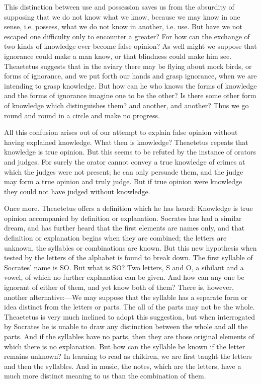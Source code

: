 \documentclass[11pt,letter]{article}
\begin{document}
\par  This distinction between use and possession saves us from the absurdity of supposing that we do not know what we know, because we may know in one sense, i.e. possess, what we do not know in another, i.e. use. But have we not escaped one difficulty only to encounter a greater? For how can the exchange of two kinds of knowledge ever become false opinion? As well might we suppose that ignorance could make a man know, or that blindness could make him see. Theaetetus suggests that in the aviary there may be flying about mock birds, or forms of ignorance, and we put forth our hands and grasp ignorance, when we are intending to grasp knowledge. But how can he who knows the forms of knowledge and the forms of ignorance imagine one to be the other? Is there some other form of knowledge which distinguishes them? and another, and another? Thus we go round and round in a circle and make no progress.

\par  All this confusion arises out of our attempt to explain false opinion without having explained knowledge. What then is knowledge? Theaetetus repeats that knowledge is true opinion. But this seems to be refuted by the instance of orators and judges. For surely the orator cannot convey a true knowledge of crimes at which the judges were not present; he can only persuade them, and the judge may form a true opinion and truly judge. But if true opinion were knowledge they could not have judged without knowledge.

\par  Once more. Theaetetus offers a definition which he has heard: Knowledge is true opinion accompanied by definition or explanation. Socrates has had a similar dream, and has further heard that the first elements are names only, and that definition or explanation begins when they are combined; the letters are unknown, the syllables or combinations are known. But this new hypothesis when tested by the letters of the alphabet is found to break down. The first syllable of Socrates' name is SO. But what is SO? Two letters, S and O, a sibilant and a vowel, of which no further explanation can be given. And how can any one be ignorant of either of them, and yet know both of them? There is, however, another alternative:—We may suppose that the syllable has a separate form or idea distinct from the letters or parts. The all of the parts may not be the whole. Theaetetus is very much inclined to adopt this suggestion, but when interrogated by Socrates he is unable to draw any distinction between the whole and all the parts. And if the syllables have no parts, then they are those original elements of which there is no explanation. But how can the syllable be known if the letter remains unknown? In learning to read as children, we are first taught the letters and then the syllables. And in music, the notes, which are the letters, have a much more distinct meaning to us than the combination of them.
\end{document}
